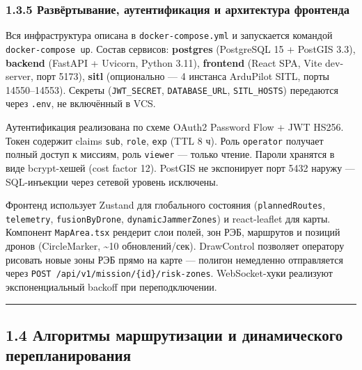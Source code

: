\hypertarget{ux440ux430ux437ux432ux451ux440ux442ux44bux432ux430ux43dux438ux435-ux430ux443ux442ux435ux43dux442ux438ux444ux438ux43aux430ux446ux438ux44f-ux438-ux430ux440ux445ux438ux442ux435ux43aux442ux443ux440ux430-ux444ux440ux43eux43dux442ux435ux43dux434ux430}{%
\subsubsection{1.3.5 Развёртывание, аутентификация и архитектура фронтенда}\label{ux440ux430ux437ux432ux451ux440ux442ux44bux432ux430ux43dux438ux435-ux430ux443ux442ux435ux43dux442ux438ux444ux438ux43aux430ux446ux438ux44f-ux438-ux430ux440ux445ux438ux442ux435ux43aux442ux443ux440ux430-ux444ux440ux43eux43dux442ux435ux43dux434ux430}}

Вся инфраструктура описана в \texttt{docker-compose.yml} и запускается командой \texttt{docker-compose\ up}. Состав сервисов: \textbf{postgres} (PostgreSQL 15 + PostGIS 3.3), \textbf{backend} (FastAPI + Uvicorn, Python 3.11), \textbf{frontend} (React SPA, Vite dev-server, порт 5173), \textbf{sitl} (опционально --- 4 инстанса ArduPilot SITL, порты 14550--14553). Секреты (\texttt{JWT\_SECRET}, \texttt{DATABASE\_URL}, \texttt{SITL\_HOSTS}) передаются через \texttt{.env}, не включённый в VCS.

Аутентификация реализована по схеме OAuth2 Password Flow + JWT HS256. Токен содержит claims \texttt{sub}, \texttt{role}, \texttt{exp} (TTL 8 ч). Роль \texttt{operator} получает полный доступ к миссиям, роль \texttt{viewer} --- только чтение. Пароли хранятся в виде bcrypt-хешей (cost factor 12). PostGIS не экспонирует порт 5432 наружу --- SQL-инъекции через сетевой уровень исключены.

Фронтенд использует Zustand для глобального состояния (\texttt{plannedRoutes}, \texttt{telemetry}, \texttt{fusionByDrone}, \texttt{dynamicJammerZones}) и react-leaflet для карты. Компонент \texttt{MapArea.tsx} рендерит слои полей, зон РЭБ, маршрутов и позиций дронов (CircleMarker, \textasciitilde10 обновлений/сек). DrawControl позволяет оператору рисовать новые зоны РЭБ прямо на карте --- полигон немедленно отправляется через \texttt{POST\ /api/v1/mission/\{id\}/risk-zones}. WebSocket-хуки реализуют экспоненциальный backoff при переподключении.

\begin{center}\rule{0.5\linewidth}{0.5pt}\end{center}

\hypertarget{ux430ux43bux433ux43eux440ux438ux442ux43cux44b-ux43cux430ux440ux448ux440ux443ux442ux438ux437ux430ux446ux438ux438-ux438-ux434ux438ux43dux430ux43cux438ux447ux435ux441ux43aux43eux433ux43e-ux43fux435ux440ux435ux43fux43bux430ux43dux438ux440ux43eux432ux430ux43dux438ux44f}{%
\subsection{1.4 Алгоритмы маршрутизации и динамического перепланирования}\label{ux430ux43bux433ux43eux440ux438ux442ux43cux44b-ux43cux430ux440ux448ux440ux443ux442ux438ux437ux430ux446ux438ux438-ux438-ux434ux438ux43dux430ux43cux438ux447ux435ux441ux43aux43eux433ux43e-ux43fux435ux440ux435ux43fux43bux430ux43dux438ux440ux43eux432ux430ux43dux438ux44f}}

